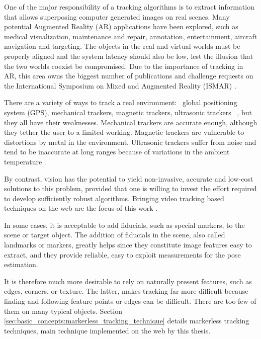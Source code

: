 One of the major responsibility of a tracking algorithms is to extract information that allows superposing computer generated images on real scenes. Many potential Augmented Reality (AR) applications have been explored, such as medical visualization, maintenance and repair, annotation, entertainment, aircraft navigation and targeting. The objects in the real and virtual worlds must be properly aligned and the system latency should also be low, lest the illusion that the two worlds coexist be compromised. \cite{Lepetit2005} Due to the importance of tracking in AR, this area owns the biggest number of publications and challenge requests on the International Symposium on Mixed and Augmented Reality (ISMAR) \cite{Zhou2008}.

There are a variety of ways to track a real environment: \eg\ global positioning system (GPS), mechanical trackers, magnetic trackers, ultrasonic trackers \etc\ \cite{Krevelen2010}, but they all have their weaknesses. Mechanical trackers are accurate enough, although they tether the user to a limited working. Magnetic trackers are vulnerable to distortions by metal in the environment. Ultrasonic trackers suffer from noise and tend to be inaccurate at long ranges because of variations in the ambient temperature \cite{Lepetit2005}.

By contrast, vision has the potential to yield non-invasive, accurate and low-cost solutions to this problem, provided that one is willing to invest the effort required to develop sufficiently robust algorithms. Bringing video tracking based techniques on the web are the focus of this work \cite{Lepetit2005}.

In some cases, it is acceptable to add fiducials, such as special markers, to the scene or target object. The addition of fiducials in the scene, also called landmarks or markers, greatly helps since they constitute image features easy to extract, and they provide reliable, easy to exploit measurements for the pose estimation.

It is therefore much more desirable to rely on naturally present features, such as edges, corners, or texture. The latter, makes tracking far more difficult because finding and following feature points or edges can be difficult. There are too few of them on many typical objects. Section \ref{sec:basic_concepts:markerless_tracking_technique} details markerless tracking techniques, main technique implemented on the web by this thesis.


